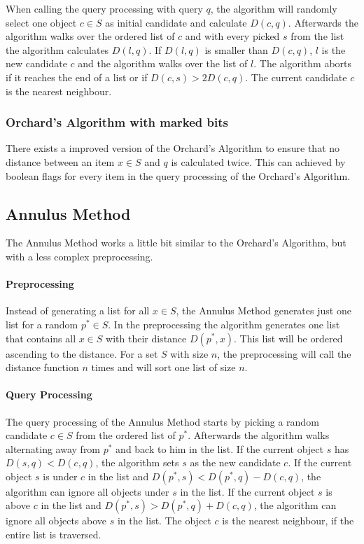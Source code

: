 \documentclass[runningheads,a4paper]{llncs}
\begin{document}
When calling the query processing with query $q$, the algorithm will randomly select one object $c \in S$ as initial
candidate and calculate $D(c, q)$. Afterwards the algorithm walks over the ordered list of $c$ and with every picked $s$
from the list the algorithm calculates $D(l, q)$. If $D(l, q)$ is smaller than $D(c, q)$, $l$ is the new candidate $c$
and the algorithm walks over the list of $l$. The algorithm aborts if it reaches the end of a list or if
$D(c, s) > 2D(c, q)$. The current candidate $c$ is the nearest neighbour.

\subsubsection{Orchard’s Algorithm with marked bits}

There exists a improved version of the Orchard’s Algorithm to ensure that no distance between an item $x \in S$ and $q$
is calculated twice. This can achieved by boolean flags for every item in the query processing of the Orchard’s
Algorithm.

\subsection{Annulus Method}

The Annulus Method works a little bit similar to the Orchard’s Algorithm, but with a less complex preprocessing.

\paragraph{Preprocessing}

Instead of generating a list for all $x \in S$, the Annulus Method generates just one list for a random $p^* \in S$. In
the preprocessing the algorithm generates one list that contains all $x \in S$ with their distance $D(p^*, x)$. This
list will be ordered ascending to the distance. For a set $S$ with size $n$, the preprocessing will call the distance
function $n$ times and will sort one list of size $n$.

\paragraph{Query Processing}

The query processing of the Annulus Method starts by picking a random candidate $c \in S$ from the ordered list of
$p^*$. Afterwards the algorithm walks alternating away from $p^*$ and back to him in the list. If the current object $s$
has $D(s, q) < D(c, q)$, the algorithm sets $s$ as the new candidate $c$. If the current object $s$ is under $c$ in the
list and $D(p^*, s) < D(p^*, q) - D(c, q)$, the algorithm can ignore all objects under $s$ in the list. If the current
object $s$ is above $c$ in the list and $D(p^*, s) > D(p^*, q) + D(c, q)$, the algorithm can ignore all objects above
$s$ in the list. The object $c$ is the nearest neighbour, if the entire list is traversed.
\end{document}
